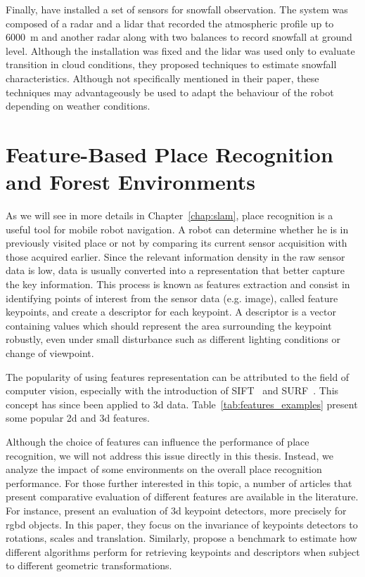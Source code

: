 Finally, \citet{servomaa2002snowfall} have installed a set of sensors for snowfall observation. The system was composed of a radar and a \gls*{lidar} that recorded the atmospheric profile up to \SI{6000}{\meter} and another radar along with two balances to record snowfall at ground level. Although the installation was fixed and the \gls*{lidar} was used only to evaluate transition in cloud conditions, they proposed techniques to estimate snowfall characteristics. Although not specifically mentioned in their paper, these techniques may advantageously be used to adapt the behaviour of the robot depending on weather conditions.  



\section{Feature-Based Place Recognition and Forest Environments}
\label{sec:literature_slam}

As we will see in more details in Chapter~\ref{chap:slam}, place recognition is a useful tool for mobile robot navigation. A robot can determine whether he is in previously visited place or not by comparing its current sensor acquisition with those acquired earlier. Since the relevant information density in the raw sensor data is low, data is usually converted into a representation that better capture the key information. This process is known as features extraction and consist in identifying points of interest from the sensor data (e.g. image), called feature keypoints, and create a descriptor for each keypoint. A descriptor is a vector containing values which should represent the area surrounding the keypoint robustly, even under small disturbance such as different lighting conditions or change of viewpoint.

The popularity of using features representation can be attributed to the field of computer vision, especially with the introduction of SIFT~\citep{Lowe2004} and SURF~\citep{Bay2006}. This concept has since been applied to \gls*{3d} data. Table~\ref{tab:features_examples} present some popular \gls*{2d} and \gls*{3d} features. 

Although the choice of features can influence the performance of place recognition, we will not address this issue directly in this thesis. Instead, we analyze the impact of some environments on the overall place recognition performance. For those further interested in this topic, a number of articles that present comparative evaluation of different features are available in the literature. For instance, \citet{Filipe2014} present an evaluation of \gls*{3d} keypoint detectors, more precisely for \gls*{rgbd} objects. In this paper, they focus on the invariance of keypoints detectors to rotations, scales and translation. Similarly, \citet{Boyer2011} propose a benchmark to estimate how different algorithms perform for retrieving keypoints and descriptors when subject to different geometric transformations.

